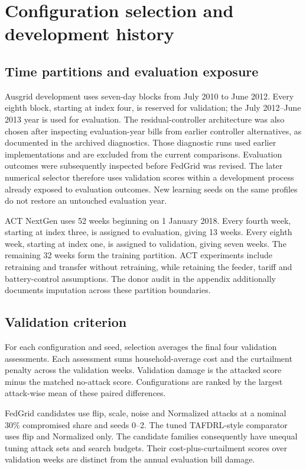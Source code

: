 \section{Configuration selection and development history}
\label{sec:selection}
\subsection{Time partitions and evaluation exposure}
Ausgrid development uses seven-day blocks from July 2010 to June 2012. Every eighth block, starting at index four, is reserved for validation; the July 2012--June 2013 year is used for evaluation. The residual-controller architecture was also chosen after inspecting evaluation-year bills from earlier controller alternatives, as documented in the archived diagnostics. Those diagnostic runs used earlier implementations and are excluded from the current comparisons. Evaluation outcomes were subsequently inspected before FedGrid was revised. The later numerical selector therefore uses validation scores within a development process already exposed to evaluation outcomes. New learning seeds on the same profiles do not restore an untouched evaluation year.

ACT NextGen uses 52 weeks beginning on 1 January 2018. Every fourth week, starting at index three, is assigned to evaluation, giving 13 weeks. Every eighth week, starting at index one, is assigned to validation, giving seven weeks. The remaining 32 weeks form the training partition. ACT experiments include retraining and transfer without retraining, while retaining the feeder, tariff and battery-control assumptions. The donor audit in the appendix additionally documents imputation across these partition boundaries.

\subsection{Validation criterion}
For each configuration and seed, selection averages the final four validation assessments. Each assessment sums household-average cost and the curtailment penalty across the validation weeks. Validation damage is the attacked score minus the matched no-attack score. Configurations are ranked by the largest attack-wise mean of these paired differences.

FedGrid candidates use flip, scale, noise and Normalized attacks at a nominal 30\% compromised share and seeds 0--2. The tuned TAFDRL-style comparator uses flip and Normalized only. The candidate families consequently have unequal tuning attack sets and search budgets. Their cost-plus-curtailment scores over validation weeks are distinct from the annual evaluation bill damage.

